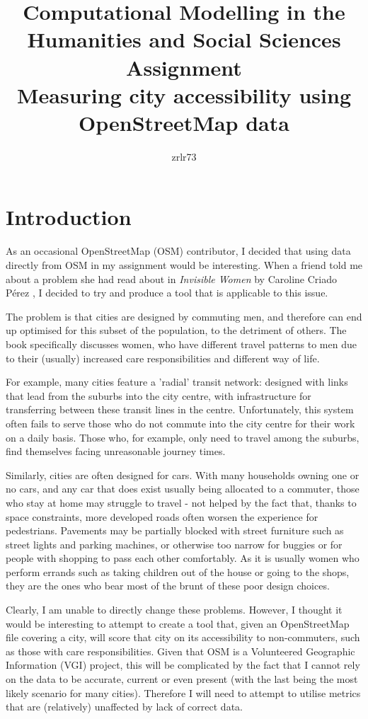 \documentclass[11pt]{article} %
\title{\vspace{-1.6cm}Computational Modelling in the Humanities and Social Sciences Assignment \\
	\vspace{0.5cm}\large Measuring city accessibility using OpenStreetMap data\vspace{-0.3cm}}
\author{zrlr73}
\date{} %
\begin{document}
\maketitle

\section{Introduction}

As an occasional OpenStreetMap (OSM) contributor, I decided that using data directly from OSM in my assignment would be interesting. When a friend told me about a problem she had read about in \textit{Invisible Women} by Caroline Criado Pérez \citeyear{Perez2019}, I decided to try and produce a tool that is applicable to this issue.

The problem is that cities are designed by commuting men, and therefore can end up optimised for this subset of the population, to the detriment of others. The book specifically discusses women, who have different travel patterns to men due to their (usually) increased care responsibilities and different way of life.

For example, many cities feature a 'radial' transit network: designed with links that lead from the suburbs into the city centre, with infrastructure for transferring between these transit lines in the centre. Unfortunately, this system often fails to serve those who do not commute into the city centre for their work on a daily basis. Those who, for example, only need to travel among the suburbs, find themselves facing unreasonable journey times.

Similarly, cities are often designed for cars. With many households owning one or no cars, and any car that does exist usually being allocated to a commuter, those who stay at home may struggle to travel - not helped by the fact that, thanks to space constraints, more developed roads often worsen the experience for pedestrians. Pavements may be partially blocked with street furniture such as street lights and parking machines, or otherwise too narrow for buggies or for people with shopping to pass each other comfortably. As it is usually women who perform errands such as taking children out of the house or going to the shops, they are the ones who bear most of the brunt of these poor design choices.

Clearly, I am unable to directly change these problems. However, I thought it would be interesting to attempt to create a tool that, given an OpenStreetMap file covering a city, will score that city on its accessibility to non-commuters, such as those with care responsibilities. Given that OSM is a Volunteered Geographic Information (VGI) project, this will be complicated by the fact that I cannot rely on the data to be accurate, current or even present (with the last being the most likely scenario for many cities). Therefore I will need to attempt to utilise metrics that are (relatively) unaffected by lack of correct data.
\end{document}
